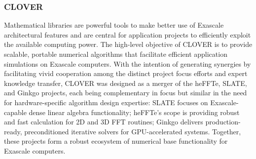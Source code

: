\subsubsection{ CLOVER} 
Mathematical libraries are powerful tools to make better use of Exascale 
architectural features and are central for application projects to efficiently 
exploit the available computing power. The high-level objective of CLOVER is to 
provide scalable, portable numerical algorithms that facilitate efficient 
application simulations on Exascale computers. With the intention of generating synergies 
by facilitating vivid cooperation among the distinct project focus efforts 
and expert knowledge transfer, CLOVER was designed as a merger of the heFFTe, SLATE, 
and Ginkgo projects, each being complementary 
in focus but similar in the need for hardware-specific algorithm design 
expertise: SLATE focuses on Exascale-capable dense linear algebra 
functionality; heFFTe’s scope is providing robust and fast calculation for 2D 
and 3D FFT routines; Ginkgo delivers production-ready, preconditioned iterative solvers for 
GPU-accelerated systems. Together, these projects form a robust ecosystem of numerical 
base functionality for Exascale computers.
\newpage
